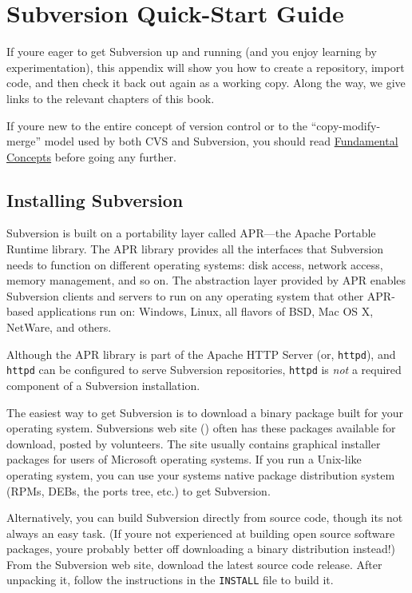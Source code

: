 \chapter{Subversion Quick-Start Guide}\label{svn.intro}

If you\textquotesingle re eager to get Subversion up and running (and
you enjoy learning by experimentation), this appendix will show you how
to create a repository, import code, and then check it back out again as
a working copy. Along the way, we give links to the relevant chapters of
this book.

If you\textquotesingle re new to the entire concept of version control
or to the ``copy-modify-merge'' model used by both CVS and Subversion,
you should read \hyperref[svn.basic]{Fundamental Concepts} before going
any further.

\section{Installing Subversion}\label{svn.intro.install}

Subversion is built on a portability layer called APR---the Apache
Portable Runtime library. The APR library provides all the interfaces
that Subversion needs to function on different operating systems: disk
access, network access, memory management, and so on. The abstraction
layer provided by APR enables Subversion clients and servers to run on
any operating system that other APR-based applications run on: Windows,
Linux, all flavors of BSD, Mac OS X, NetWare, and others.

Although the APR library is part of the Apache HTTP Server (or,
\texttt{httpd}), and \texttt{httpd} can be configured to serve
Subversion repositories, \texttt{httpd} is \emph{not} a required
component of a Subversion installation.

The easiest way to get Subversion is to download a binary package built
for your operating system. Subversion\textquotesingle s web site
(\href{https://subversion.apache.org}{}) often has these packages
available for download, posted by volunteers. The site usually contains
graphical installer packages for users of Microsoft operating systems.
If you run a Unix-like operating system, you can use your
system\textquotesingle s native package distribution system (RPMs, DEBs,
the ports tree, etc.) to get Subversion.

Alternatively, you can build Subversion directly from source code,
though it\textquotesingle s not always an easy task. (If
you\textquotesingle re not experienced at building open source software
packages, you\textquotesingle re probably better off downloading a
binary distribution instead!) From the Subversion web site, download the
latest source code release. After unpacking it, follow the instructions
in the \texttt{INSTALL} file to build it.

